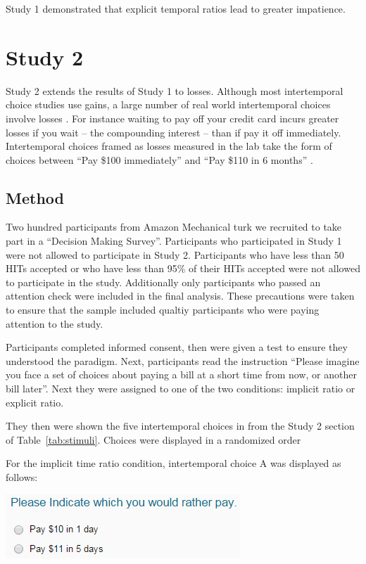 \documentclass[]{article}
\begin{document}
Study 1 demonstrated that explicit temporal ratios lead to greater impatience. 


\section{Study 2}

Study 2 extends the results of Study 1 to losses. 
Although most intertemporal choice studies use gains, a large number of real world intertemporal choices involve losses \cite{Hardisty2013}. 
For instance waiting to pay off your credit card incurs greater losses if you wait -- the compounding interest -- than if pay it off immediately.
Intertemporal choices framed as losses measured in the lab take the form of choices between ``Pay \$100 immediately'' and  ``Pay \$110 in 6 months'' \cite{Hardisty2015}.

\subsection{Method}
Two hundred participants from Amazon Mechanical turk we recruited to take part in a ``Decision Making Survey''. 
Participants who participated in Study 1 were not allowed to participate in Study 2. 
Participants who have less than 50 HITs accepted or  who have less than 95\% of their HITs accepted were not allowed to participate in the study. 
Additionally only participants who passed an attention check were included in the final analysis.
These precautions were taken to ensure that the sample included qualtiy participants who were paying attention to the study. 

Participants completed informed consent, then were given a test to ensure they understood the paradigm.
Next, participants read the instruction
``Please imagine you face a set of choices
about paying a bill at a short time from now, or another bill later''.
Next they were assigned to one of the two conditions: implicit ratio or explicit ratio. 

They then were shown the five intertemporal choices in from the Study 2 section of  Table~\ref{tab:stimuli}. 
Choices were displayed in a randomized order


For the implicit time ratio condition, intertemporal choice A was displayed as follows: 

\includegraphics[]{study2_implicit}
\end{document}
